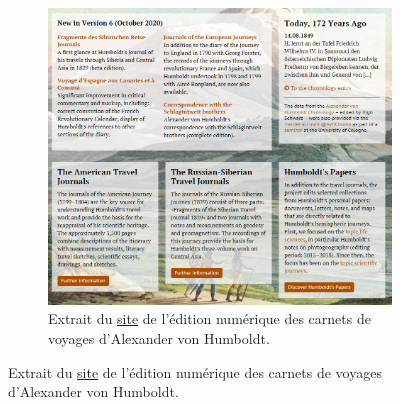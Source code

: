 \documentclass[a4paper, 12pt, twoside]{book}
\begin{document}
\begin{figure}
\begin{subfigure}[b]{0.7\textwidth}
        \includegraphics[width=1\linewidth]{img/ehd_websitepresentation.png}
        \caption{Extrait du \href{https://edition-humboldt.de/index.xql?l=en}{site} de l'édition numérique des carnets de voyages d'Alexander von Humboldt.}
    \end{subfigure}
    \vspace{-10pt}
\end{figure}
\end{document}
